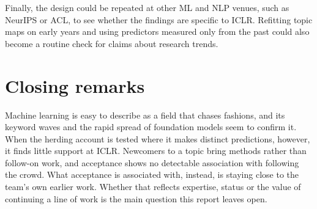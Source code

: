 Finally, the design could be repeated at other ML and NLP venues, such as NeurIPS or ACL, to see whether the findings
are specific to ICLR. Refitting topic maps on early years and using predictors measured only from the past could also
become a routine check for claims about research trends.

\section{Closing remarks}

Machine learning is easy to describe as a field that chases fashions, and its keyword waves and the rapid spread of
foundation models seem to confirm it. When the herding account is tested where it makes distinct predictions, however,
it finds little support at ICLR. Newcomers to a topic bring methods rather than follow-on work, and acceptance shows
no detectable association with following the crowd. What acceptance is associated with, instead, is staying close to
the team's own earlier work. Whether that reflects expertise, status or the value of continuing a line of
work is the main question this report leaves open.
